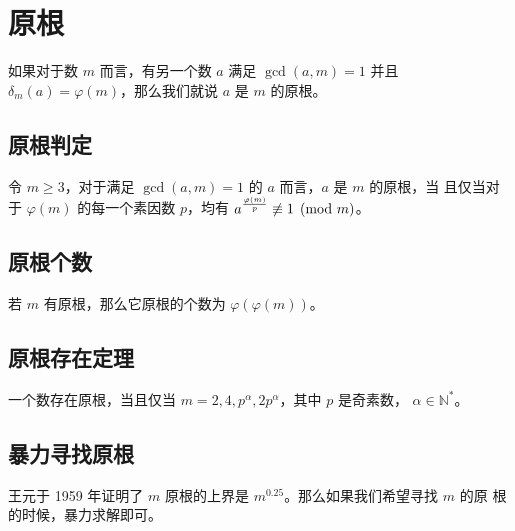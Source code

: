\section{原根} \label{sec:原根}
如果对于数 $m$ 而言，有另一个数 $a$ 满足 $\gcd(a,m)=1$ 并且 $\delta_m(a) =
\varphi(m)$，那么我们就说 $a$ 是 $m$ 的原根。

\subsection{原根判定}
令 $m \ge 3$，对于满足 $\gcd(a, m) = 1$ 的 $a$ 而言，$a$ 是 $m$ 的原根，当
且仅当对于 $\varphi(m)$ 的每一个素因数 $p$，均有 $a^{\varphi(m) \over p}
\not\equiv 1 \pmod m$。

\subsection{原根个数}
若 $m$ 有原根，那么它原根的个数为 $\varphi(\varphi(m))$。

\subsection{原根存在定理}
一个数存在原根，当且仅当 $m = 2, 4, p^\alpha, 2p^\alpha$，其中 $p$ 是奇素数，
$\alpha \in \mathbb{N}^*$。

\subsection{暴力寻找原根}
王元于 1959 年证明了 $m$ 原根的上界是 $m^{0.25}$。那么如果我们希望寻找 $m$ 的原
根的时候，暴力求解即可。
